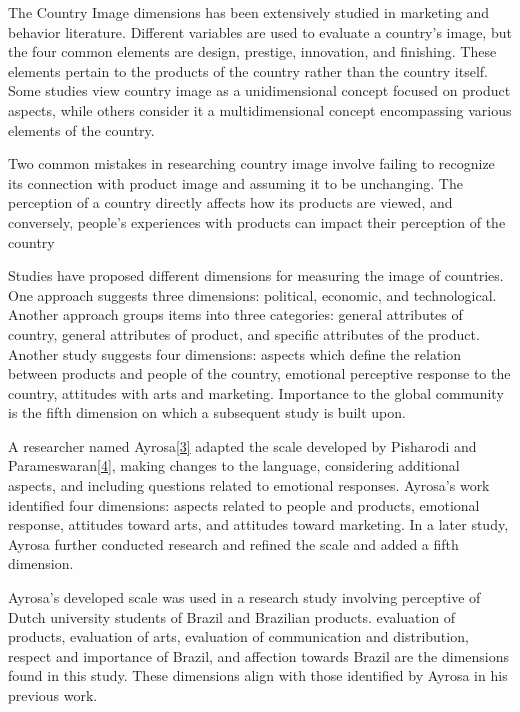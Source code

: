 \documentclass[conference]{IEEEtran}
\begin{document}
	The Country Image dimensions has been extensively studied in marketing and behavior literature. Different variables are used to evaluate a country’s image, but the four common elements are design, prestige, innovation, and finishing. These elements pertain to the products of the country rather than the country itself. Some studies view country image as a unidimensional concept focused on product aspects, while others consider it a multidimensional concept encompassing various elements of the country. 
 
	Two common mistakes in researching country image involve failing to recognize its connection with product image and assuming it to be unchanging. The perception of a country directly affects how its products are viewed, and conversely, people's experiences with products can impact their perception of the country 
 
	Studies have proposed different dimensions for measuring the image of countries. One approach suggests three dimensions: political, economic, and technological. Another approach groups items into three categories: general attributes of country, general attributes of product, and specific attributes of the product. Another study suggests four dimensions: aspects which define the relation between products and people of the country, emotional perceptive response to the country, attitudes with arts and marketing. Importance to the global community is the fifth dimension on which a subsequent study is built upon. 

	A researcher named Ayrosa\href{https://www.researchgate.net/publication/237023445_Uma_Aplicacao_da_Abordagem_de_Personificacao_no_Estudo_de_Imagem_de_Pais
}{[3]} adapted the scale developed by Pisharodi and Parameswaran\href{https://www.acrwebsite.org/volumes/7377/volumes/v19/NA-19}{[4]}, making changes to the language, considering additional aspects, and including questions related to emotional responses. Ayrosa's work identified four dimensions: aspects related to people and products, emotional response, attitudes toward arts, and attitudes toward marketing. In a later study, Ayrosa further conducted research and refined the scale and added a fifth dimension. 

	Ayrosa’s developed scale was used in a research study involving perceptive of Dutch university students of Brazil and Brazilian products. evaluation of products, evaluation of arts, evaluation of communication and distribution, respect and importance of Brazil, and affection towards Brazil are the dimensions found in this study. These dimensions align with those identified by Ayrosa in his previous work. 
 
\end{document}
